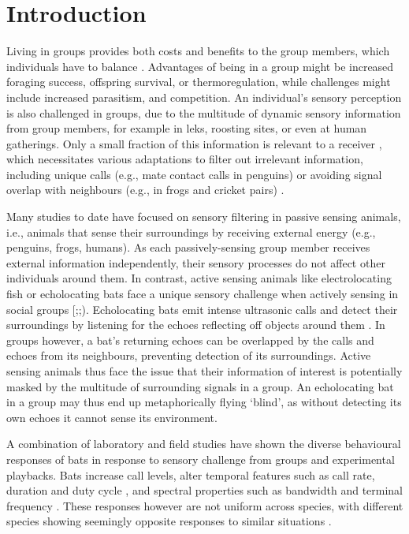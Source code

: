 \documentclass[
]{book}
\begin{document}
\newpage

\hypertarget{introduction-1}{%
\section{Introduction}\label{introduction-1}}

Living in groups provides both costs and benefits to the group members, which individuals have to balance \citep{pulliam1984living}. Advantages of being in a group might be increased foraging success, offspring survival, or thermoregulation, while challenges might include increased parasitism, and competition. An individual's sensory perception is also challenged in groups, due to the multitude of dynamic sensory information from group members, for example in leks, roosting sites, or even at human gatherings. Only a small fraction of this information is relevant to a receiver \citep{socialintegr}, which necessitates various adaptations to filter out irrelevant information, including unique calls (e.g., mate contact calls in penguins) or avoiding signal overlap with neighbours (e.g., in frogs and cricket pairs) \citep{socialintegr}.

Many studies to date have focused on sensory filtering in passive sensing animals, i.e., animals that sense their surroundings by receiving external energy (e.g., penguins, frogs, humans)\citep{zweifel2020defining, nelson2006a}. As each passively-sensing group member receives external information independently, their sensory processes do not affect other individuals around them. In contrast, active sensing animals like electrolocating fish or echolocating bats face a unique sensory challenge when actively sensing in social groups {[}\citet{ulanovsky2008a};\citet{gillam2010a};\citet{watanabe1963change}). Echolocating bats emit intense ultrasonic calls and detect their surroundings by listening for the echoes reflecting off objects around them \citep{griffin1958a}. In groups however, a bat's returning echoes can be overlapped by the calls and echoes from its neighbours, preventing detection of its surroundings\citep{ulanovsky2008a}. Active sensing animals thus face the issue that their information of interest is potentially masked by the multitude of surrounding signals in a group. An echolocating bat in a group may thus end up metaphorically flying `blind', as without detecting its own echoes it cannot sense its environment.

A combination of laboratory and field studies have shown the diverse behavioural responses of bats in response to sensory challenge from groups and experimental playbacks. Bats increase call levels, alter temporal features such as call rate, duration and duty cycle \citep{amichai2015a, jarvis2013a, lu2020echolocating, hage2013ambient, lin2016a, gomes2020individual}, and spectral properties such as bandwidth and terminal frequency \citep{hase2018a, cvikel2015b, goetze2016a, fawcett2015echolocation}. These responses however are not uniform across species, with different species showing seemingly opposite responses to similar situations \citep{ulanovsky2004a, amichai2015a, jarvis2013a, adams2017a}.
\end{document}

